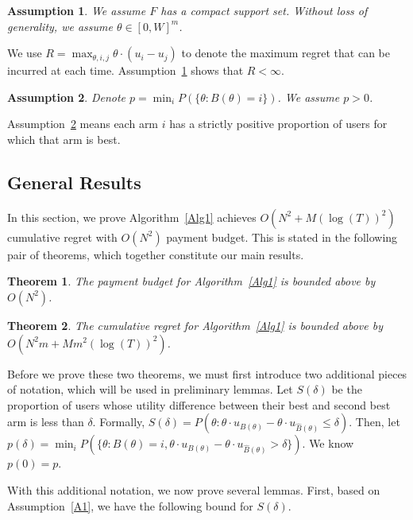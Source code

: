 \documentclass[twoside,11pt]{article}
\newtheorem{assumption}{Assumption}
\newtheorem{theorem}{Theorem}
\begin{document}
\begin{assumption} We assume $F$ has a compact support set. Without loss of generality, we assume $\theta\in [0,W]^m$.
\label{A2}
\end{assumption}

We use $R = \max_{\theta, i,j} \theta \cdot (u_i - u_j)$ to denote the maximum regret that can be incurred at each time.  Assumption~\ref{A2} shows that $R<\infty$.

\begin{assumption}
Denote $p=\min_{i}P(\{\theta: B(\theta)=i\})$. We assume $p>0$.
\label{A3}
\end{assumption}

Assumption~\ref{A3} means each arm $i$ has a strictly positive proportion of users for which that arm is best. 

\subsection{General Results}

In this section, we prove Algorithm~\ref{Alg1} achieves $O(N^2+M(\log(T))^2)$ cumulative regret with $O(N^2)$ payment budget.  This is stated in the following pair of theorems, which together constitute our main results.

\begin{theorem}
The payment budget for Algorithm~\ref{Alg1} is bounded above by $O(N^2)$. 
\label{rst:budget}
\end{theorem}


\begin{theorem}
The cumulative regret for Algorithm~\ref{Alg1} is bounded above by $O(N^2 m + M m^2(\log(T))^2)$.
\label{rst:regret}
\end{theorem}



Before we prove these two theorems, we must first introduce two additional pieces of notation, which will be used in preliminary lemmas.  Let $S(\delta)$ be the proportion of users whose utility difference between their best and second best arm is less than $\delta$. Formally, $S(\delta)=P(\theta: \theta \cdot u_{B(\theta)}-\theta\cdot u_{\hat{B}(\theta)}\leq \delta)$. Then, let $p(\delta)=\min_{i}P(\{\theta:B(\theta)=i,\theta\cdot u_{B(\theta)}-\theta\cdot u_{\hat{B}(\theta)}>\delta\})$. We know $p(0)=p$. 

With this additional notation, we now prove several lemmas.
First, based on Assumption~\ref{A1}, we have the following bound for $S(\delta)$.
\end{document}
